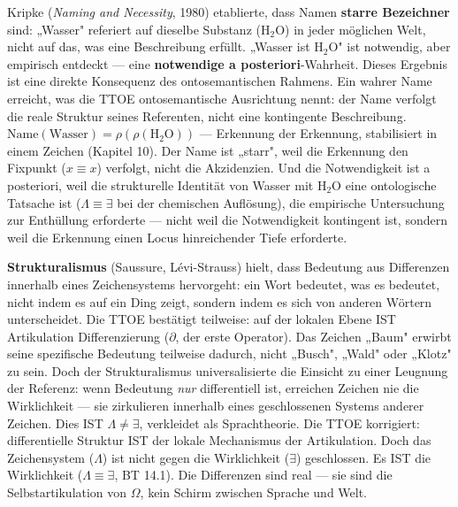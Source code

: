 \documentclass[10pt, openany, oneside]{book}
\begin{document}
Kripke (\textit{Naming and Necessity}, 1980) etablierte, dass Namen \textbf{starre Bezeichner} sind: „Wasser" referiert auf dieselbe Substanz (H$_2$O) in jeder möglichen Welt, nicht auf das, was eine Beschreibung erfüllt. „Wasser ist H$_2$O" ist notwendig, aber empirisch entdeckt --- eine \textbf{notwendige a posteriori}-Wahrheit. Dieses Ergebnis ist eine direkte Konsequenz des ontosemantischen Rahmens. Ein wahrer Name erreicht, was die TTOE ontosemantische Ausrichtung nennt: der Name verfolgt die reale Struktur seines Referenten, nicht eine kontingente Beschreibung. $\text{Name}(\text{Wasser}) = \rho(\rho(\text{H}_2\text{O}))$ --- Erkennung der Erkennung, stabilisiert in einem Zeichen (Kapitel 10). Der Name ist „starr", weil die Erkennung den Fixpunkt ($x \equiv x$) verfolgt, nicht die Akzidenzien. Und die Notwendigkeit ist a posteriori, weil die strukturelle Identität von Wasser mit H$_2$O eine ontologische Tatsache ist ($\Lambda \equiv \exists$ bei der chemischen Auflösung), die empirische Untersuchung zur Enthüllung erforderte --- nicht weil die Notwendigkeit kontingent ist, sondern weil die Erkennung einen Locus hinreichender Tiefe erforderte.

\textbf{Strukturalismus} (Saussure, Lévi-Strauss) hielt, dass Bedeutung aus Differenzen innerhalb eines Zeichensystems hervorgeht: ein Wort bedeutet, was es bedeutet, nicht indem es auf ein Ding zeigt, sondern indem es sich von anderen Wörtern unterscheidet. Die TTOE bestätigt teilweise: auf der lokalen Ebene IST Artikulation Differenzierung ($\partial$, der erste Operator). Das Zeichen „Baum" erwirbt seine spezifische Bedeutung teilweise dadurch, nicht „Busch", „Wald" oder „Klotz" zu sein. Doch der Strukturalismus universalisierte die Einsicht zu einer Leugnung der Referenz: wenn Bedeutung \textit{nur} differentiell ist, erreichen Zeichen nie die Wirklichkeit --- sie zirkulieren innerhalb eines geschlossenen Systems anderer Zeichen. Dies IST $\Lambda \neq \exists$, verkleidet als Sprachtheorie. Die TTOE korrigiert: differentielle Struktur IST der lokale Mechanismus der Artikulation. Doch das Zeichensystem ($\Lambda$) ist nicht gegen die Wirklichkeit ($\exists$) geschlossen. Es IST die Wirklichkeit ($\Lambda \equiv \exists$, BT 14.1). Die Differenzen sind real --- sie sind die Selbstartikulation von $\Omega$, kein Schirm zwischen Sprache und Welt.
\end{document}

